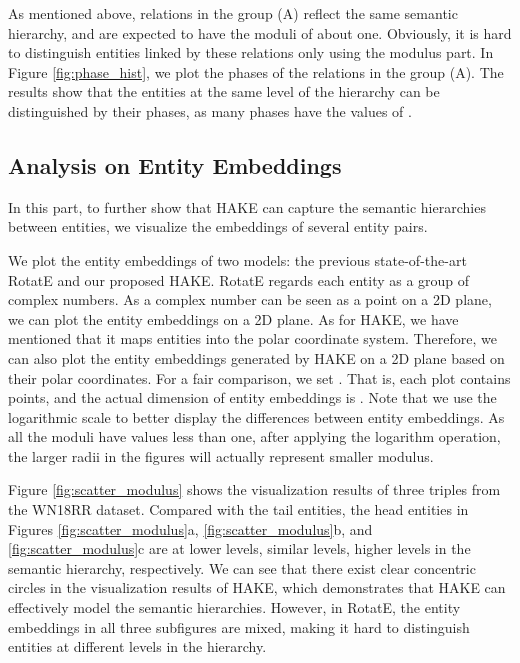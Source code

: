 \documentclass[letterpaper]{article} \usepackage{aaai20}  \usepackage{times}  \usepackage{helvet} \usepackage{courier}  \usepackage[hyphens]{url}  \usepackage{graphicx} \urlstyle{rm} \def\UrlFont{\rm}  \usepackage{graphicx}  \frenchspacing  \setlength{\pdfpagewidth}{8.5in}  \setlength{\pdfpageheight}{11in}
\newcommand{\citep}{\cite}
\begin{document}
As mentioned above, relations in the group (A) reflect the same semantic hierarchy, and are expected to have the moduli of about one. Obviously, it is hard to distinguish entities linked by these relations only using the modulus part. In Figure \ref{fig:phase_hist}, we plot the phases of the relations in the group (A). The results show that the entities at the same level of the hierarchy can be distinguished by their phases, as many phases have the values of .

\begin{table}[ht]
    \centering
    \caption{Comparison results with TKRL models \citep{hType} on FB15k dataset. RHE, WHE, RHE+STC, and WHE+STC are four versions of TKRL model , of which the results are taken from the original paper.}
    \label{table:cmp_tkrl}
\end{table}

\subsection{Analysis on Entity Embeddings}
In this part, to further show that HAKE can capture the semantic hierarchies between entities, we visualize the embeddings of several entity pairs.

We plot the entity embeddings of two models: the previous state-of-the-art RotatE and our proposed HAKE. RotatE regards each entity as a group of complex numbers. As a complex number can be seen as a point on a 2D plane, we can plot the entity embeddings on a 2D plane. As for HAKE, we have mentioned that it maps entities into the polar coordinate system. Therefore, we can also plot the entity embeddings generated by HAKE on a 2D plane based on their polar coordinates. For a fair comparison, we set . That is, each plot contains  points, and the actual dimension of entity embeddings is .  Note that we use the logarithmic scale to better display the differences between entity embeddings. As all the moduli have values less than one, after applying the logarithm operation, the larger radii in the figures will actually represent smaller modulus.

Figure \ref{fig:scatter_modulus} shows the visualization results of three triples from the WN18RR dataset. Compared with the tail entities, the head entities in Figures \ref{fig:scatter_modulus}a, \ref{fig:scatter_modulus}b, and \ref{fig:scatter_modulus}c are at lower levels, similar levels, higher levels in the semantic hierarchy, respectively. We can see that there exist clear concentric circles in the visualization results of HAKE, which demonstrates that HAKE can effectively model the semantic hierarchies. However, in RotatE, the entity embeddings in all three subfigures are mixed, making it hard to distinguish entities at different levels in the hierarchy.
\end{document}
